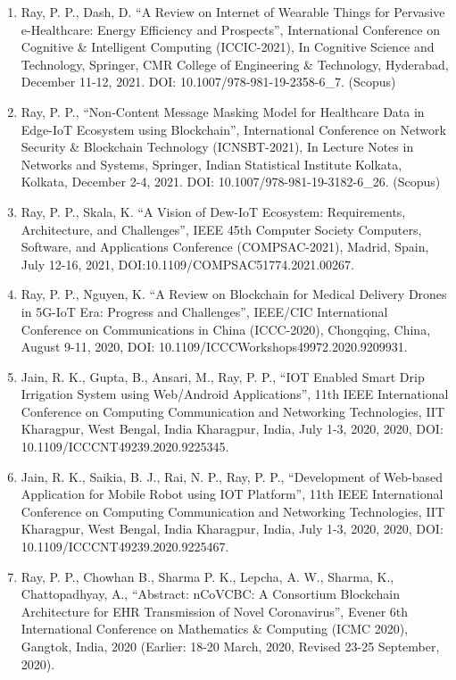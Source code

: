 \documentclass[11pt,a4paper]{moderncv}
\begin{document}
\begin{adjustwidth}{6em}{0pt}
\begin{enumerate}
	\item Ray, P. P., Dash, D. “A Review on Internet of Wearable Things for Pervasive e-Healthcare: Energy Efficiency and Prospects”, International Conference on Cognitive \& Intelligent Computing (ICCIC-2021), In Cognitive Science and Technology, Springer, CMR College of Engineering \& Technology, Hyderabad, December 11-12, 2021. DOI: 10.1007/978-981-19-2358-6\_7. (Scopus)
	
	\item Ray, P. P., “Non-Content Message Masking Model for Healthcare Data in Edge-IoT Ecosystem using Blockchain”, International Conference on Network Security \& Blockchain Technology (ICNSBT-2021), In Lecture Notes in Networks and Systems, Springer, Indian Statistical Institute Kolkata, Kolkata, December 2-4, 2021. DOI: 10.1007/978-981-19-3182-6\_26. (Scopus)  
	
	\item Ray, P. P., Skala, K. “A Vision of Dew-IoT Ecosystem: Requirements, Architecture, and Challenges”, IEEE 45th Computer Society Computers, Software, and Applications Conference (COMPSAC-2021), Madrid, Spain, July 12-16, 2021, DOI:10.1109/COMPSAC51774.2021.00267.
	
	\item Ray, P. P., Nguyen, K. “A Review on Blockchain for Medical Delivery Drones in 5G-IoT Era: Progress and Challenges”, IEEE/CIC International Conference on Communications in China (ICCC-2020), Chongqing, China, August 9-11, 2020, DOI: 10.1109/ICCCWorkshops49972.2020.9209931.
	
	\item Jain, R. K., Gupta, B., Ansari, M., Ray, P. P., “IOT Enabled Smart Drip Irrigation System using Web/Android Applications”, 11th IEEE International Conference on Computing Communication and Networking Technologies, IIT Kharagpur, West Bengal, India Kharagpur, India, July 1-3, 2020, 2020, DOI: 10.1109/ICCCNT49239.2020.9225345.
	
	\item Jain, R. K., Saikia, B. J., Rai, N. P., Ray, P. P., “Development of Web-based Application for Mobile Robot using IOT Platform”, 11th IEEE International Conference on Computing Communication and Networking Technologies, IIT Kharagpur, West Bengal, India Kharagpur, India, July 1-3, 2020, 2020, DOI: 10.1109/ICCCNT49239.2020.9225467.
	
	\item Ray, P. P., Chowhan B., Sharma P. K., Lepcha, A. W., Sharma, K., Chattopadhyay, A., “Abstract: nCoVCBC: A Consortium Blockchain Architecture for EHR Transmission of Novel Coronavirus”, Evener 6th International Conference on Mathematics \& Computing (ICMC 2020), Gangtok, India, 2020 (Earlier: 18-20 March, 2020, Revised 23-25 September, 2020). 
	

\end{enumerate}
\end{adjustwidth}
\end{document}
